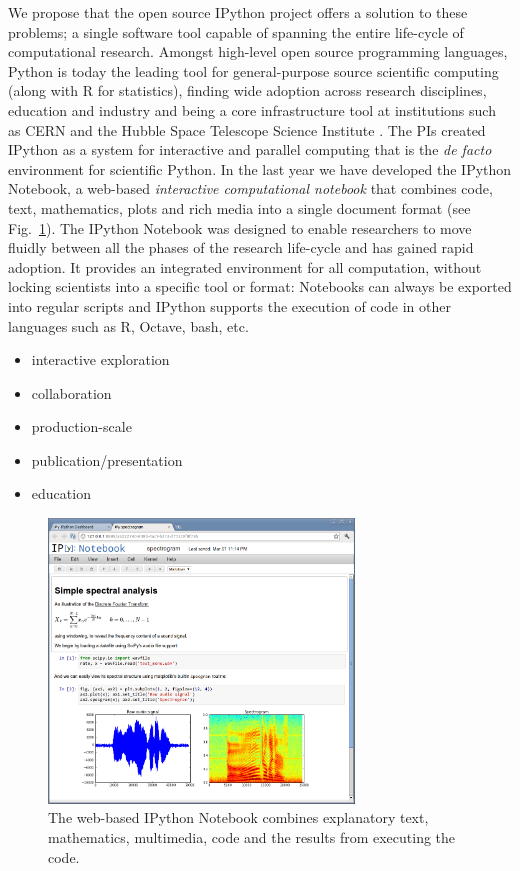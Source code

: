 \documentclass[ChapterTOCs,krantz2]{krantz} %
\begin{document}
We propose that the open source IPython project \cite{PER-GRA:2007}
offers a solution to these problems; a single software tool capable
of spanning the entire life-cycle of computational research. Amongst
high-level open source programming languages, Python is today the
leading tool for general-purpose source scientific computing (along
with R for statistics), finding wide adoption across research disciplines,
education and industry and being a core infrastructure tool at institutions
such as CERN and the Hubble Space Telescope Science Institute \cite{Perez2011,ganga09,SST}.
The PIs created IPython as a system for interactive and parallel computing
that is the\emph{ de facto} environment for scientific Python. In
the last year we have developed the IPython Notebook, a web-based\emph{
interactive computational notebook} that combines code, text, mathematics,
plots and rich media into a single document format (see Fig.~\ref{fig:IPython-notebook}).
The IPython Notebook was designed to enable researchers to move fluidly
between all the phases of the research life-cycle and has gained rapid
adoption. It provides an integrated environment for all computation,
without locking scientists into a specific tool or format: Notebooks
can always be exported into regular scripts and IPython supports the
execution of code in other languages such as R, Octave, bash, etc.

\begin{itemize}

\item interactive exploration
\item collaboration
\item production-scale
\item publication/presentation \cite{brown2012single}
\item education
 
\end{itemize}
\begin{figure}
\begin{centering}
\includegraphics[width=3.2in]{fig/ipython-notebook-specgram.png}
\par\end{centering}

\caption{\label{fig:IPython-notebook}The web-based IPython Notebook combines
explanatory text, mathematics, multimedia, code and the results from
executing the code.}
\end{figure}
\end{document}
